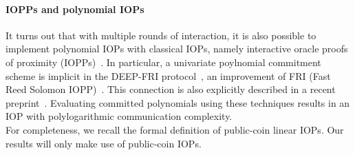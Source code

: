 
\paragraph{IOPPs and polynomial IOPs} It turns out that with multiple rounds of interaction, it is also possible to implement polynomial IOPs with classical IOPs, namely interactive oracle proofs of proximity (IOPPs)~\cite{STOC:ReiRotRot16,TCC:BenChiSpo16}. In particular, a univariate poylnomial commitment scheme is implicit in the DEEP-FRI protocol~\cite{ECCC:BGKS19}, an improvement of FRI (Fast Reed Solomon IOPP)~\cite{ICALP:BBHR18}. This connection is also explicitly described in a recent preprint~\cite{MatterLabs}. Evaluating committed polynomials using these techniques results in an IOP with polylogarithmic communication complexity.\\

For completeness, we recall the formal definition of public-coin linear IOPs. Our results will only make use of public-coin IOPs. 

